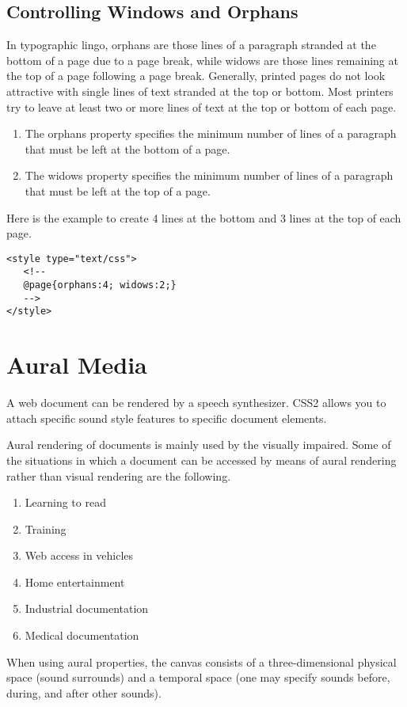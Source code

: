 \documentclass[a4paper,oneside]{book}
\numberwithin{equation}{chapter}
\begin{document}
\subsection{Controlling Windows and Orphans}
In typographic lingo, orphans are those lines of a paragraph stranded at the bottom of a page due to a page break, while widows are those lines remaining at the top of a page following a page break. Generally, printed pages do not look attractive with single lines of text stranded at the top or bottom. Most printers try to leave at least two or more lines of text at the top or bottom of each page.
\begin{enumerate}
\item The orphans property specifies the minimum number of lines of a paragraph that must be left at the bottom of a page.
\item The widows property specifies the minimum number of lines of a paragraph that must be left at the top of a page.
\end{enumerate}
Here is the example to create 4 lines at the bottom and 3 lines at the top of each page.
\begin{verbatim}
<style type="text/css">
   <!--
   @page{orphans:4; widows:2;}
   -->
</style>
\end{verbatim}
\section{Aural Media}
A web document can be rendered by a speech synthesizer. CSS2 allows you to attach specific sound style features to specific document elements.

Aural rendering of documents is mainly used by the visually impaired. Some of the situations in which a document can be accessed by means of aural rendering rather than visual rendering are the following.
\begin{enumerate}
\item Learning to read
\item Training
\item Web access in vehicles
\item Home entertainment
\item Industrial documentation
\item Medical documentation
\end{enumerate}
When using aural properties, the canvas consists of a three-dimensional physical space (sound surrounds) and a temporal space (one may specify sounds before, during, and after other sounds).
\end{document}
